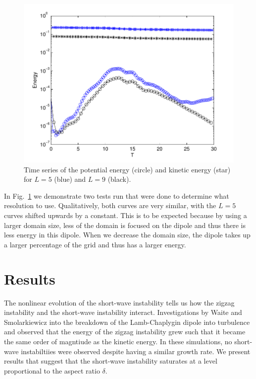 \begin{figure}
\begin{center}
\includegraphics[width=\textwidth]{energy_test}
\caption{Time series of the potential energy (circle) and kinetic energy (star) for $L=5$ (blue) and $L=9$ (black).}
\label{test_energy}
\end{center}
\end{figure}
In Fig.~\ref{test_energy} we demonstrate two tests run that were done to determine what resolution to use. Qualitatively, both curves are very similar, with the $L=5$ curves shifted upwards by a constant. This is to be expected because by using a larger domain size, less of the domain is focused on the dipole and thus there is less energy in this dipole. When we decrease the domain size, the dipole takes up a larger percentage of the grid and thus has a larger energy. 

\section{Results}
The nonlinear evolution of the short-wave instability tells us how the zigzag instability and the short-wave instability interact. Investigations by Waite and Smolarkiewicz into the breakdown of the Lamb-Chaplygin dipole into turbulence and observed that the energy of the zigzag instability grew such that it became the same order of magntiude as the kinetic energy. In these simulations, no short-wave instabiltiies were observed despite having a similar growth rate. We present results that suggest that the short-wave instability saturates at a level proportional to the aspect ratio $\delta$.

